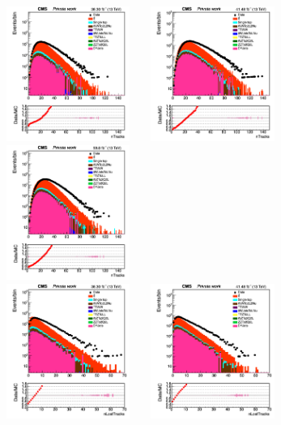 \documentclass{cernatlasnote}
\begin{document}
 \begin{figure}[htp]
\centering
\includegraphics[width=4.6cm, height=4.4cm]{images/emu_channel/2016/16_Range_0pt2_1pt8/track_nTracks_TRK_Log.png}
\includegraphics[width=4.6cm, height=4.4cm]{images/emu_channel/2017/17_Range_0pt2_1pt8/track_nTracks_TRK_Log.png}
 \includegraphics[width=4.6cm, height=4.4cm]{images/emu_channel/2018/18_Range_0pt2_1pt8/track_nTracks_TRK_Log.png}\\
 \includegraphics[width=4.6cm, height=4.4cm]{images/emu_channel/2016/16_Range_0pt2_1pt8/track_nLostTracks_TRK_Log.png}
\includegraphics[width=4.6cm, height=4.4cm]{images/emu_channel/2017/17_Range_0pt2_1pt8/track_nLostTracks_TRK_Log.png}

\end{figure}
\end{document}
